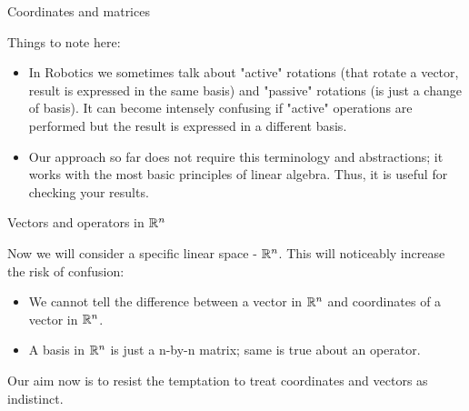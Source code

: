 \documentclass{beamer}
\begin{document}
\begin{frame}{Coordinates and matrices}
	\begin{flushleft}
		
		Things to note here:
		
		\begin{itemize}
			\item In Robotics we sometimes talk about "active" rotations (that rotate a vector, result is expressed in the same basis) and "passive" rotations (is just a change of basis). It can become intensely confusing if "active" operations are performed but the result is expressed in a different basis.
			\item Our approach so far does not require this terminology and abstractions; it works with the most basic principles of linear algebra. Thus, it is useful for checking your results.
		\end{itemize}
		
		
	\end{flushleft}
\end{frame}



\begin{frame}{Vectors and operators in $\mathbb{R}^n$}
	\begin{flushleft}
		
		Now we will consider a specific linear space - $\mathbb{R}^n$. This will noticeably increase the risk of confusion:
		
		\bigskip
		
		\begin{itemize}
			\item We cannot tell the difference between a vector in $\mathbb{R}^n$ and coordinates of a vector in $\mathbb{R}^n$.
			
			\item A basis in $\mathbb{R}^n$ is just a n-by-n matrix; same is true about an operator.
		\end{itemize}
		
		Our aim now is to resist the temptation to treat coordinates and vectors as indistinct.
		
	\end{flushleft}
\end{frame}
\end{document}
